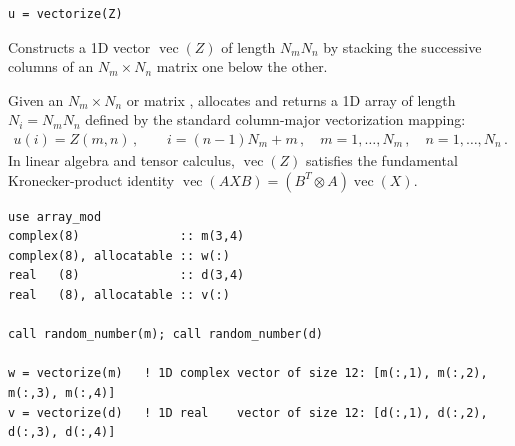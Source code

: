 
\lstset{language=[95]Fortran}
\begin{lstlisting}
u = vectorize(Z)
\end{lstlisting}

Constructs a 1D vector $\operatorname{vec}(Z)$ of length $N_m N_n$ by stacking the successive columns of an $N_m\times N_n$ matrix  one below the other.

Given an $N_m\times N_n$  or  matrix ,  allocates and returns a 1D array  of length $N_i = N_m N_n$ defined by the standard column-major vectorization mapping:
\begin{align}
  u(i) = Z(m,n)\, , \qquad i = (n - 1) N_m + m\, , \quad m = 1,\ldots,N_m\, , \quad n = 1,\ldots,N_n\, .
\end{align}
In linear algebra and tensor calculus, $\operatorname{vec}(Z)$ satisfies the fundamental Kronecker-product identity $\operatorname{vec}(A X B) = (B^T \otimes A)\operatorname{vec}(X)$.

\begin{description}[leftmargin=2.2cm, style=nextline]
\end{description}

\lstset{language=[95]Fortran}
\begin{lstlisting}
use array_mod
complex(8)              :: m(3,4)
complex(8), allocatable :: w(:)
real   (8)              :: d(3,4)
real   (8), allocatable :: v(:)

call random_number(m); call random_number(d)

w = vectorize(m)   ! 1D complex vector of size 12: [m(:,1), m(:,2), m(:,3), m(:,4)]
v = vectorize(d)   ! 1D real    vector of size 12: [d(:,1), d(:,2), d(:,3), d(:,4)]
\end{lstlisting}

